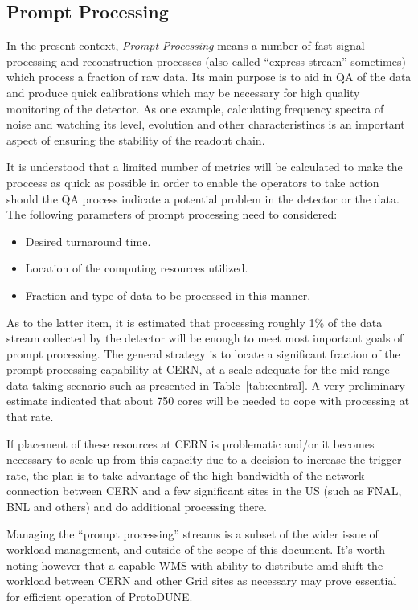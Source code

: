 \documentclass[pdftex,12pt,letter]{article}
\newcommand{\pd}{ProtoDUNE\xspace}
\begin{document}
\subsection{Prompt Processing}
\label{sec:prompt_processing}
In the present context, \textit{Prompt Processing} means a number of fast signal processing and reconstruction processes
(also called ``express stream'' sometimes) which process a fraction of raw data. Its main purpose is to aid in QA of the data
and produce quick calibrations which may be necessary for high quality monitoring of the detector. As one example,
calculating frequency spectra of noise and watching its level, evolution and other characteristincs is an important aspect of ensuring
the stability of the readout chain.

It is understood
that a limited number of metrics will be calculated to make the proccess as quick as possible in order to enable
the operators to take action should the QA process indicate a potential problem in the detector or the data.
The following parameters of prompt processing need to considered:
\begin{itemize}
\item Desired turnaround time.
\item Location of the computing resources utilized.
\item Fraction and type of data to be processed in this manner.
\end{itemize}

\noindent As to the latter item, it is estimated that processing roughly 1\% of the data stream collected by the detector will
be enough to meet most important goals of prompt processing. 
The general strategy is to locate a significant fraction of the prompt processing capability at CERN, at a scale adequate for the mid-range
data taking scenario such as presented in Table\, \ref{tab:central}. A very preliminary estimate indicated that about 750 cores
will be needed to cope with processing at that rate.

If placement of these resources at CERN is problematic and/or it becomes necessary to scale up from
this capacity due to a decision to increase the trigger rate,
the plan is to take advantage of the high bandwidth of the network connection between
CERN and a few significant sites in the US (such as FNAL, BNL and others) and do additional processing there.

Managing the ``prompt processing'' streams is a subset of the wider issue of workload management, and outside of
the scope of this document. It's worth noting however that a capable WMS with ability to distribute amd shift the
workload between CERN and other Grid sites as necessary may prove essential for efficient operation of \pd.


\end{document}
